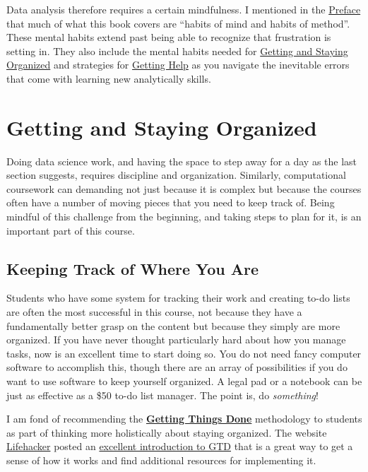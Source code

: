 \documentclass[]{book}
\theoremstyle{definition}
\theoremstyle{definition}
\theoremstyle{definition}
\theoremstyle{remark}
\begin{document}
Data analysis therefore requires a certain mindfulness. I mentioned in
the \protect\hyperlink{preface}{Preface} that much of what this book
covers are ``habits of mind and habits of method''. These mental habits
extend past being able to recognize that frustration is setting in. They
also include the mental habits needed for
\protect\hyperlink{getting-and-staying-organized}{Getting and Staying
Organized} and strategies for \protect\hyperlink{getting-help}{Getting
Help} as you navigate the inevitable errors that come with learning new
analytically skills.

\hypertarget{getting-and-staying-organized}{\section{Getting and Staying
Organized}\label{getting-and-staying-organized}}

Doing data science work, and having the space to step away for a day as
the last section suggests, requires discipline and organization.
Similarly, computational coursework can demanding not just because it is
complex but because the courses often have a number of moving pieces
that you need to keep track of. Being mindful of this challenge from the
beginning, and taking steps to plan for it, is an important part of this
course.

\subsection{Keeping Track of Where You
Are}\label{keeping-track-of-where-you-are}

Students who have some system for tracking their work and creating to-do
lists are often the most successful in this course, not because they
have a fundamentally better grasp on the content but because they simply
are more organized. If you have never thought particularly hard about
how you manage tasks, now is an excellent time to start doing so. You do
not need fancy computer software to accomplish this, though there are an
array of possibilities if you do want to use software to keep yourself
organized. A legal pad or a notebook can be just as effective as a \$50
to-do list manager. The point is, do \emph{something}!

I am fond of recommending the
\href{http://gettingthingsdone.com}{\textbf{Getting Things Done}}
methodology to students as part of thinking more holistically about
staying organized. The website \href{https://lifehacker.com}{Lifehacker}
posted an
\href{https://lifehacker.com/productivity-101-a-primer-to-the-getting-things-done-1551880955}{excellent
introduction to GTD} that is a great way to get a sense of how it works
and find additional resources for implementing it.
\end{document}
